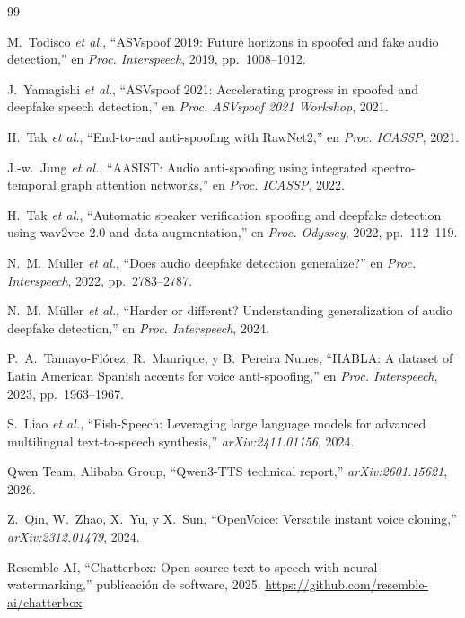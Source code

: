 \documentclass[11pt]{article}
\begin{document}
\begin{thebibliography}{99}

M.~Todisco \emph{et al.},
``ASVspoof 2019: Future horizons in spoofed and fake audio detection,''
en \emph{Proc. Interspeech}, 2019, pp.~1008--1012.

J.~Yamagishi \emph{et al.},
``ASVspoof 2021: Accelerating progress in spoofed and deepfake speech
detection,'' en \emph{Proc. ASVspoof 2021 Workshop}, 2021.

H.~Tak \emph{et al.},
``End-to-end anti-spoofing with RawNet2,'' en \emph{Proc. ICASSP}, 2021.

J.-w.~Jung \emph{et al.},
``AASIST: Audio anti-spoofing using integrated spectro-temporal graph
attention networks,'' en \emph{Proc. ICASSP}, 2022.

H.~Tak \emph{et al.},
``Automatic speaker verification spoofing and deepfake detection using
wav2vec 2.0 and data augmentation,'' en \emph{Proc. Odyssey}, 2022,
pp.~112--119.

N.~M.~M\"uller \emph{et al.},
``Does audio deepfake detection generalize?'' en \emph{Proc.
Interspeech}, 2022, pp.~2783--2787.

N.~M.~M\"uller \emph{et al.},
``Harder or different? Understanding generalization of audio deepfake
detection,'' en \emph{Proc. Interspeech}, 2024.

P.~A.~Tamayo-Fl\'orez, R.~Manrique, y B.~Pereira Nunes,
``HABLA: A dataset of Latin American Spanish accents for voice
anti-spoofing,'' en \emph{Proc. Interspeech}, 2023, pp.~1963--1967.

S.~Liao \emph{et al.},
``Fish-Speech: Leveraging large language models for advanced
multilingual text-to-speech synthesis,'' \emph{arXiv:2411.01156}, 2024.

Qwen Team, Alibaba Group,
``Qwen3-TTS technical report,'' \emph{arXiv:2601.15621}, 2026.

Z.~Qin, W.~Zhao, X.~Yu, y X.~Sun,
``OpenVoice: Versatile instant voice cloning,'' \emph{arXiv:2312.01479},
2024.

Resemble AI,
``Chatterbox: Open-source text-to-speech with neural watermarking,''
publicaci\'on de software, 2025.
\url{https://github.com/resemble-ai/chatterbox}


\end{thebibliography}
\end{document}

